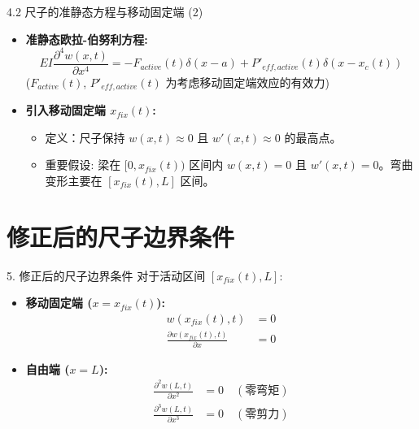 \documentclass{beamer}
\begin{document}
\begin{frame}{4.2 尺子的准静态方程与移动固定端 (2)}
    \begin{itemize}
        \item \textbf{准静态欧拉-伯努利方程:}
            \begin{equation*}
                \boxed{EI \frac{\partial^4 w(x,t)}{\partial x^4} = -F_{active}(t) \delta(x - a) + P'_{eff, active}(t) \delta(x - x_c(t))}
            \end{equation*}
            ($F_{active}(t)$, $P'_{eff, active}(t)$ 为考虑移动固定端效应的有效力)
        \item \textbf{引入移动固定端 $x_{fix}(t)$:}
            \begin{itemize}
                \item 定义：尺子保持 $w(x,t) \approx 0$ 且 $w'(x,t) \approx 0$ 的最高点。
                \item 重要假设: 梁在 $[0, x_{fix}(t))$ 区间内 $w(x,t) = 0$ 且 $w'(x,t) = 0$。弯曲变形主要在 $[x_{fix}(t), L]$ 区间。
            \end{itemize}
    \end{itemize}
\end{frame}

\section{修正后的尺子边界条件}
\begin{frame}{5. 修正后的尺子边界条件}
    对于活动区间 $[x_{fix}(t), L]$:
    \begin{itemize}
        \item \textbf{移动固定端 ($x=x_{fix}(t)$):}
            \begin{align*}
                w(x_{fix}(t), t) &= 0 \\
                \frac{\partial w(x_{fix}(t), t)}{\partial x} &= 0
            \end{align*}
        \item \textbf{自由端 ($x=L$):}
            \begin{align*}
                \frac{\partial^2 w(L,t)}{\partial x^2} &= 0 \quad (\text{零弯矩}) \\
                \frac{\partial^3 w(L,t)}{\partial x^3} &= 0 \quad (\text{零剪力})
            \end{align*}
    \end{itemize}
\end{frame}
\end{document}
